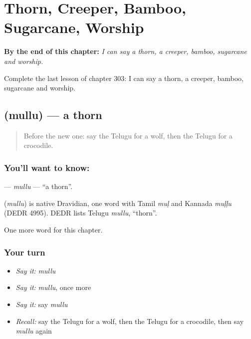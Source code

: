 
\chapter{Thorn, Creeper, Bamboo, Sugarcane, Worship}
\label{ch:te-thorn-creeper-bamboo-sugarcane-worship}

\begin{chapteropening}
\textbf{By the end of this chapter:} \emph{I can say a thorn, a creeper, bamboo, sugarcane and worship.}

Complete the last lesson of chapter 303: I can say a thorn, a creeper, bamboo, sugarcane and worship.
\end{chapteropening}

\section[\texorpdfstring{\te{ముల్లు} (mullu)}{ముల్లు (mullu)}]{ (mullu) — a thorn}

\label{lesson:TE-C303-mullu}



\begin{quote}
Before the new one: say the Telugu for a wolf, then the Telugu for a crocodile.
\end{quote}

\subsection*{You'll want to know: }
\textbf{} — \emph{mullu} — \textquotedblleft{}a thorn\textquotedblright{}.

\begin{cousinweb}
\textbf{} (\emph{mullu}) is native Dravidian, one word with Tamil \emph{muḷ} and Kannada \emph{muḷḷu} (DEDR 4995). DEDR lists Telugu \emph{mullu}, \textquotedblleft{}thorn\textquotedblright{}.
\end{cousinweb}

\begin{grammarlens}[title={What you've built}]
One more word for this chapter.
\end{grammarlens}

\subsection*{Your turn}
\begin{itemize}
\raggedright
  \item \emph{Say it:} \emph{mullu}
  \item \emph{Say it:} \emph{mullu}, once more
  \item \emph{Say it:} say \emph{mullu}
  \item \emph{Recall:} say the Telugu for a wolf, then the Telugu for a crocodile, then say \emph{mullu} again
\end{itemize}


